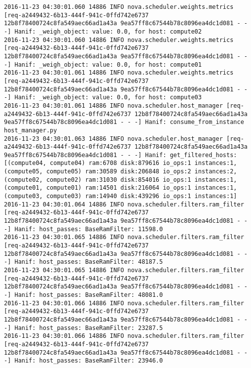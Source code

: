 \begin{lstlisting}[frame=single, caption={The filter scheduler log trace for 10 virtual instances}, label={lst:filterschedulercodetracelog10vi}, escapechar=|]
2016-11-23 04:30:01.060 14886 INFO nova.scheduler.weights.metrics [req-a2449432-6b13-444f-941c-0ffd742e6737 12b8f78400724c8fa549aec66ad1a43a 9ea57ff8c67544b78c8096ea4dc1d081 - - -] Hanif: _weigh_object: value: 0.0, for host: compute02
2016-11-23 04:30:01.060 14886 INFO nova.scheduler.weights.metrics [req-a2449432-6b13-444f-941c-0ffd742e6737 12b8f78400724c8fa549aec66ad1a43a 9ea57ff8c67544b78c8096ea4dc1d081 - - -] Hanif: _weigh_object: value: 0.0, for host: compute01
2016-11-23 04:30:01.061 14886 INFO nova.scheduler.weights.metrics [req-a2449432-6b13-444f-941c-0ffd742e6737 12b8f78400724c8fa549aec66ad1a43a 9ea57ff8c67544b78c8096ea4dc1d081 - - -] Hanif: _weigh_object: value: 0.0, for host: compute03
2016-11-23 04:30:01.061 14886 INFO nova.scheduler.host_manager [req-a2449432-6b13-444f-941c-0ffd742e6737 12b8f78400724c8fa549aec66ad1a43a 9ea57ff8c67544b78c8096ea4dc1d081 - - -] Hanif: consume_from_instance host_manager.py
2016-11-23 04:30:01.063 14886 INFO nova.scheduler.host_manager [req-a2449432-6b13-444f-941c-0ffd742e6737 12b8f78400724c8fa549aec66ad1a43a 9ea57ff8c67544b78c8096ea4dc1d081 - - -] Hanif: get_filtered_hosts: [(compute04, compute04) ram:6708 disk:879616 io_ops:1 instances:1, (compute05, compute05) ram:30589 disk:206848 io_ops:2 instances:2, (compute02, compute02) ram:31030 disk:854016 io_ops:1 instances:1, (compute01, compute01) ram:14501 disk:216064 io_ops:1 instances:1, (compute03, compute03) ram:14940 disk:439296 io_ops:1 instances:1]
2016-11-23 04:30:01.064 14886 INFO nova.scheduler.filters.ram_filter [req-a2449432-6b13-444f-941c-0ffd742e6737 12b8f78400724c8fa549aec66ad1a43a 9ea57ff8c67544b78c8096ea4dc1d081 - - -] Hanif: host_passes: BaseRamFilter: 11598.0
2016-11-23 04:30:01.065 14886 INFO nova.scheduler.filters.ram_filter [req-a2449432-6b13-444f-941c-0ffd742e6737 12b8f78400724c8fa549aec66ad1a43a 9ea57ff8c67544b78c8096ea4dc1d081 - - -] Hanif: host_passes: BaseRamFilter: 48187.5
2016-11-23 04:30:01.065 14886 INFO nova.scheduler.filters.ram_filter [req-a2449432-6b13-444f-941c-0ffd742e6737 12b8f78400724c8fa549aec66ad1a43a 9ea57ff8c67544b78c8096ea4dc1d081 - - -] Hanif: host_passes: BaseRamFilter: 48081.0
2016-11-23 04:30:01.066 14886 INFO nova.scheduler.filters.ram_filter [req-a2449432-6b13-444f-941c-0ffd742e6737 12b8f78400724c8fa549aec66ad1a43a 9ea57ff8c67544b78c8096ea4dc1d081 - - -] Hanif: host_passes: BaseRamFilter: 23287.5
2016-11-23 04:30:01.066 14886 INFO nova.scheduler.filters.ram_filter [req-a2449432-6b13-444f-941c-0ffd742e6737 12b8f78400724c8fa549aec66ad1a43a 9ea57ff8c67544b78c8096ea4dc1d081 - - -] Hanif: host_passes: BaseRamFilter: 23946.0

\end{lstlisting}
